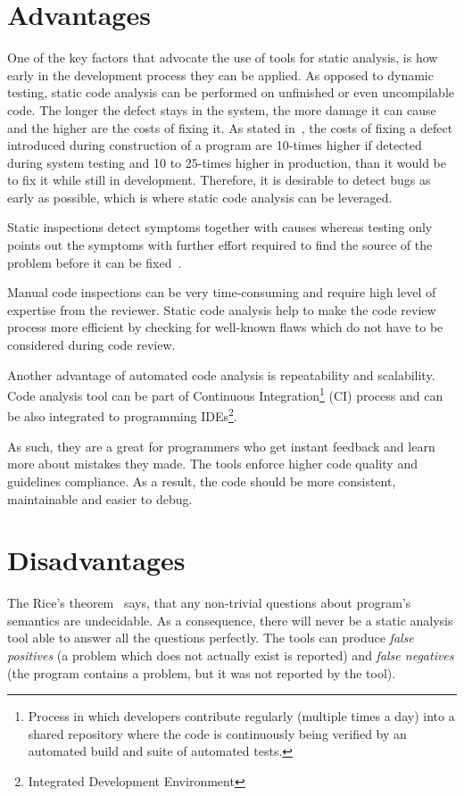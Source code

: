 \documentclass[
  digital, %
  table,   %
  lof,     %
  lot,     %
  oneside,
]{fithesis3}
\begin{document}
\section{Advantages}
One of the key factors that advocate the use of tools for static analysis, is how early in the development process they can be applied. As opposed to dynamic testing, static code analysis can be performed on unfinished or even uncompilable code. The longer the defect stays in the system, the more damage it can cause and the higher are the costs of fixing it. As stated in~\cite[p. 29]{code-complete}, the costs of fixing a defect introduced during construction of a program are 10-times higher if detected during system testing and 10 to 25-times higher in production, than it would be to fix it while still in development. Therefore, it is desirable to detect bugs as early as possible, which is where static code analysis can be leveraged.

Static inspections detect symptoms together with causes whereas testing only points out the symptoms with further effort required to find the source of the problem before it can be fixed~\cite[p. 472]{code-complete}.

Manual code inspections can be very time-consuming and require high level of expertise from the reviewer. Static code analysis help to make the code review process more efficient by checking for well-known flaws which do not have to be considered during code review.

Another advantage of automated code analysis is repeatability and scalability. Code analysis tool can be part of Continuous Integration\footnote{Process in which developers contribute regularly (multiple times a day) into a shared repository where the code is continuously being verified by an automated build and suite of automated tests.} (CI) process and can be also integrated to programming IDEs\footnote{Integrated Development Environment}. 

As such, they are a great for programmers who get instant feedback and learn more about mistakes they made. The tools enforce higher code quality and guidelines compliance. As a result, the code should be more consistent, maintainable and easier to debug.
  
\section{Disadvantages}
The Rice's theorem~\cite{direct-proofs-of-rices-theorem} says, that any non-trivial questions about program's semantics are undecidable. As a consequence, there will never be a static analysis tool able to answer all the questions perfectly. The tools can produce \textit{false positives} (a problem which does not actually exist is reported) and \textit{false negatives} (the program contains a problem, but it was not reported by the tool).
\end{document}

